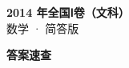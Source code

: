 \documentclass[zihao=-4, a4paper]{ctexart}
\begin{document}
\begin{center}
  {\Large\bfseries 2014 年全国Ⅰ卷（文科）}\\[4pt]
  {\large 数学 · 简答版}
\end{center}
\medskip
{}

\clearpage
{}
\begin{center}{\Large\bfseries 答案速查}\end{center}
\medskip

\end{document}

